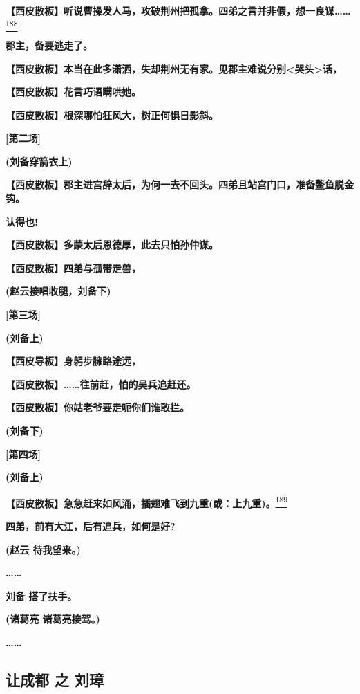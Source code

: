 \textbf{【西皮散板】听说曹操发人马，攻破荆州把孤拿。四弟之言并非假，想一良谋\ldots{}\ldots{}}\protect\hyperlink{fn188}{\textsuperscript{188}}

\textbf{郡主，备要逃走了。}

\textbf{【西皮散板】本当在此多潇洒，失却荆州无有家。见郡主难说分别\textless{}哭头\textgreater{}话，}

\textbf{【西皮散板】花言巧语瞒哄她。}

\textbf{【西皮散板】根深哪怕狂风大，树正何惧日影斜。}

\textbf{{[}第二场{]}}

\textbf{(刘备穿箭衣上)}

\textbf{【西皮散板】郡主进宫辞太后，为何一去不回头。四弟且站宫门口，准备鳌鱼脱金钩。}

\textbf{认得也!}

\textbf{【西皮散板】多蒙太后恩德厚，此去只怕孙仲谋。}

\textbf{【西皮散板】四弟与孤带走兽，}

\textbf{(赵云接唱收腿，刘备下)}

\textbf{{[}第三场{]}}

\textbf{(刘备上)}

\textbf{【西皮导板】身躬步臃路途远，}

\textbf{【西皮散板】\ldots{}\ldots{}往前赶，怕的吴兵追赶还。}

\textbf{【西皮散板】你姑老爷要走呃你们谁敢拦。}

\textbf{(刘备下)}

\textbf{{[}第四场{]}}

\textbf{(刘备上)}

\textbf{【西皮散板】急急赶来如风涌，插翅难飞到九重(或：上九重)。}\protect\hyperlink{fn189}{\textsuperscript{189}}

\textbf{四弟，前有大江，后有追兵，如何是好?}

\textbf{(赵云 待我望来。)}

\textbf{\ldots{}\ldots{}}

\textbf{刘备 搭了扶手。}

\textbf{(诸葛亮 诸葛亮接驾。)}

\textbf{\ldots{}\ldots{}}

\hypertarget{ux8ba9ux6210ux90fd-ux4e4b-ux5218ux748b}{%
\subsection{让成都 之
刘璋}\label{ux8ba9ux6210ux90fd-ux4e4b-ux5218ux748b}}

